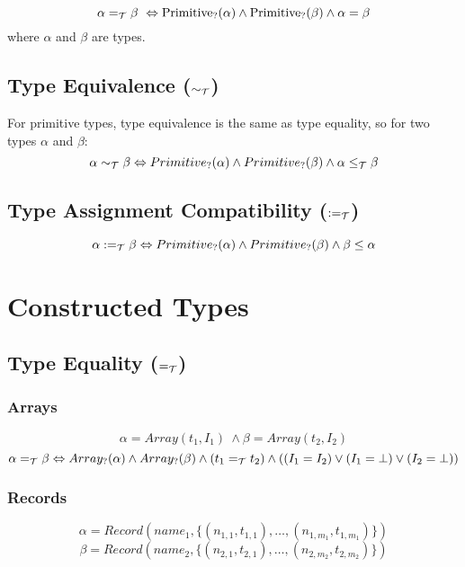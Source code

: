\documentclass[]{article}
\begin{document}
\[
\alpha =_{\cal T} \beta\ \Leftrightarrow \mbox{Primitive}_?(\alpha) \wedge \mbox{Primitive}_?(\beta) \wedge \alpha = \beta
\]
where $\alpha$ and $\beta$ are types.

\subsection{Type Equivalence ($\sim_{\cal T}$)}

For primitive types, type equivalence is the same as type equality, so for two types $\alpha$ and $\beta$:
\[
\alpha \sim_{\cal T} \beta \Leftrightarrow Primitive_?(\alpha) \wedge Primitive_?(\beta) \wedge \alpha \leq_{\cal T} \beta
\]


\subsection{Type Assignment Compatibility ($:=_{\cal T}$)}

\[
\alpha :=_{\cal T} \beta \Leftrightarrow Primitive_?(\alpha) \wedge Primitive_?(\beta) \wedge  \beta \leq \alpha
\]




\section{Constructed Types}

\subsection{Type Equality ($=_{\cal T}$)}

\subsubsection{Arrays}
\[
\alpha = Array(t_1, I_1)\ \wedge \beta =  Array(t_2, I_2)
\]
\[
\alpha =_{\cal T} \beta \Leftrightarrow Array_?(\alpha) \wedge Array_?(\beta) \wedge (t_1 =_{\cal T} t_2) \wedge ((I_1 = I_2) \vee (I_1 = \bot) \vee (I_2 = \bot))
\]

\subsubsection{Records}

\[
\alpha = Record(name_1, \{(n_{1,1},t_{1,1}),\ldots,(n_{1,m_1}, t_{1,m_1})\})
\]
\[
\beta = Record(name_2, \{(n_{2,1},t_{2,1}),\ldots,(n_{2,m_2}, t_{2,m_2})\})
\]
\end{document}
